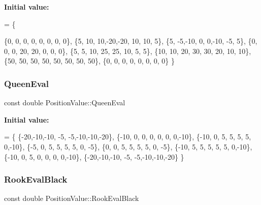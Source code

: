 {\bfseries Initial value\+:}
\begin{DoxyCode}
=
        \{
                            
                   \{0,  0,  0,  0,  0,  0,  0,  0\},
                   \{5, 10, 10,-20,-20, 10, 10,  5\},
                    \{5, -5,-10,  0,  0,-10, -5,  5\},
                   \{0,  0,  0, 20, 20,  0,  0,  0\},
                   \{5,  5, 10, 25, 25, 10,  5,  5\},
                  \{10, 10, 20, 30, 30, 20, 10, 10\},
                  \{50, 50, 50, 50, 50, 50, 50, 50\},
                  \{0,  0,  0,  0,  0,  0,  0,  0\}
        \}
\end{DoxyCode}
\mbox{\label{class_position_value_a8cb8ebb700f65d2fe88157b1075b4e65}} 
\subsubsection{\texorpdfstring{Queen\+Eval}{QueenEval}}
{\footnotesize\ttfamily const double Position\+Value\+::\+Queen\+Eval\hspace{0.3cm}{\ttfamily [static]}}

{\bfseries Initial value\+:}
\begin{DoxyCode}
=
        \{
                \{-20,-10,-10, -5, -5,-10,-10,-20\},
                \{-10,  0,  0,  0,  0,  0,  0,-10\},
                \{-10,  0,  5,  5,  5,  5,  0,-10\},
                \{-5,  0,  5,  5,  5,  5,  0, -5\},
                \{0,  0,  5,  5,  5,  5,  0, -5\},
                \{-10,  5,  5,  5,  5,  5,  0,-10\},
                \{-10,  0,  5,  0,  0,  0,  0,-10\},
                \{-20,-10,-10, -5, -5,-10,-10,-20\}
        \}
\end{DoxyCode}
\mbox{\label{class_position_value_a3e647b26938d16c61f83f62b7b6a99b4}} 
\subsubsection{\texorpdfstring{Rook\+Eval\+Black}{RookEvalBlack}}
{\footnotesize\ttfamily const double Position\+Value\+::\+Rook\+Eval\+Black\hspace{0.3cm}{\ttfamily [static]}}

